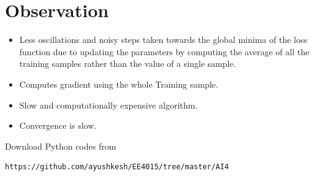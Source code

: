 \documentclass[journal,12pt,twocolumn]{IEEEtran}
\begin{document}
\section{Observation}
\begin{itemize}
  \item Less oscillations and noisy steps taken towards the global minima of the loss function due to updating the parameters by computing the average of all the training samples rather than the value of a single sample.
  \item Computes gradient using the whole Training sample.
  \item Slow and computationally expensive algorithm.
  \item Convergence is slow.
\end{itemize}
Download Python codes from 
%
\begin{lstlisting}
https://github.com/ayushkesh/EE4015/tree/master/AI4
\end{lstlisting}
\end{document}
